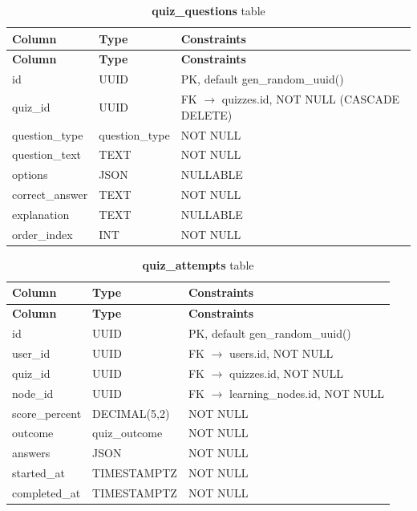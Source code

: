 \begin{longtable}{p{3cm}p{2.5cm}p{5cm}}
\caption{\textbf{quiz\_questions} table}
\label{tab:ch04_quiz_questions}\\
\toprule
\textbf{Column} & \textbf{Type} & \textbf{Constraints} \\
\midrule
\endfirsthead
\toprule
\textbf{Column} & \textbf{Type} & \textbf{Constraints} \\
\midrule
\endhead
id & UUID & PK, default gen\_random\_uuid() \\
quiz\_id & UUID & FK $\rightarrow$ quizzes.id, NOT NULL (CASCADE DELETE) \\
question\_type & question\_type & NOT NULL \\
question\_text & TEXT & NOT NULL \\
options & JSON & NULLABLE \\
correct\_answer & TEXT & NOT NULL \\
explanation & TEXT & NULLABLE \\
order\_index & INT & NOT NULL \\
\bottomrule
\end{longtable}

\begin{longtable}{p{3cm}p{2.5cm}p{5cm}}
\caption{\textbf{quiz\_attempts} table}
\label{tab:ch04_quiz_attempts}\\
\toprule
\textbf{Column} & \textbf{Type} & \textbf{Constraints} \\
\midrule
\endfirsthead
\toprule
\textbf{Column} & \textbf{Type} & \textbf{Constraints} \\
\midrule
\endhead
id & UUID & PK, default gen\_random\_uuid() \\
user\_id & UUID & FK $\rightarrow$ users.id, NOT NULL \\
quiz\_id & UUID & FK $\rightarrow$ quizzes.id, NOT NULL \\
node\_id & UUID & FK $\rightarrow$ learning\_nodes.id, NOT NULL \\
score\_percent & DECIMAL(5,2) & NOT NULL \\
outcome & quiz\_outcome & NOT NULL \\
answers & JSON & NOT NULL \\
started\_at & TIMESTAMPTZ & NOT NULL \\
completed\_at & TIMESTAMPTZ & NOT NULL \\
\bottomrule
\end{longtable}

